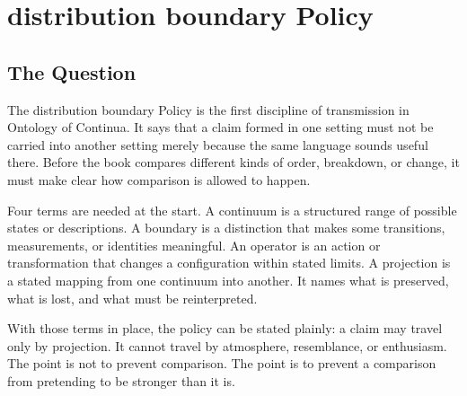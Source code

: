 \documentclass[11pt,a4paper,openany]{book}
\begin{document}
\section{distribution boundary Policy}
\subsection{The Question}
The distribution boundary Policy is the first discipline of transmission in Ontology of Continua. It says that a claim formed in one setting must not be carried into another setting merely because the same language sounds useful there. Before the book compares different kinds of order, breakdown, or change, it must make clear how comparison is allowed to happen. \cite{haken_synergetics,nicolis_prigogine_selforg}\par
Four terms are needed at the start. A continuum is a structured range of possible states or descriptions. A boundary is a distinction that makes some transitions, measurements, or identities meaningful. An operator is an action or transformation that changes a configuration within stated limits. A projection is a stated mapping from one continuum into another. It names what is preserved, what is lost, and what must be reinterpreted.\par
With those terms in place, the policy can be stated plainly: a claim may travel only by projection. It cannot travel by atmosphere, resemblance, or enthusiasm. The point is not to prevent comparison. The point is to prevent a comparison from pretending to be stronger than it is.\par
\end{document}
